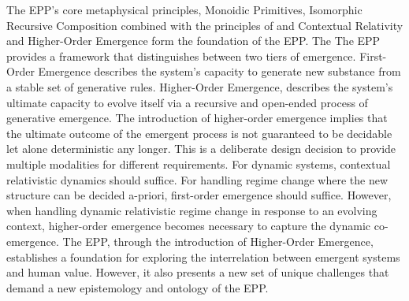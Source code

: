 The EPP's core metaphysical principles, Monoidic Primitives, Isomorphic Recursive Composition combined with the principles of and Contextual Relativity and  Higher-Order Emergence form the foundation of the EPP. The The EPP provides a framework that distinguishes between two tiers of emergence. First-Order Emergence describes the system's capacity to generate new  substance from a stable set of generative rules. Higher-Order Emergence, describes the system's ultimate capacity to evolve itself via a recursive and open-ended process of generative emergence. The introduction of higher-order emergence implies that the ultimate outcome of the emergent process is not guaranteed to be decidable let alone deterministic any longer. This is a deliberate design decision to provide multiple modalities for different requirements. For dynamic systems, contextual relativistic dynamics should suffice. For handling regime change where the new structure can be decided a-priori, first-order emergence should suffice. However, when handling dynamic relativistic regime change in response to an evolving context, higher-order emergence becomes necessary to capture the dynamic co-emergence. The EPP, through the introduction of Higher-Order Emergence, establishes a foundation for exploring the interrelation between emergent systems and human value. However, it also presents a new set of unique challenges that demand a new epistemology and ontology of the EPP. 

\newpage